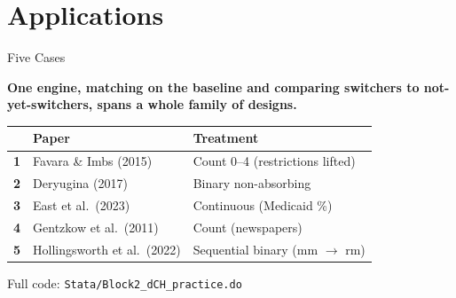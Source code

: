 \documentclass[main.tex]{subfiles}
\begin{document}
\section{Applications}


\begin{frame}{Five Cases}

  \textbf{One engine, matching on the baseline and comparing switchers to
  not-yet-switchers, spans a whole family of designs.}

  \medskip
  \begin{tabular}{@{}cll@{}}
    \toprule
     & \textbf{Paper} & \textbf{Treatment} \\
    \midrule
    \textbf{1} & Favara \& Imbs (2015)        & Count 0--4 (restrictions lifted) \\[4pt]
    \textbf{2} & Deryugina (2017)             & Binary non-absorbing \\[4pt]
    \textbf{3} & East et al.\ (2023)          & Continuous (Medicaid \%) \\[4pt]
    \textbf{4} & Gentzkow et al.\ (2011)      & Count (newspapers) \\[4pt]
    \textbf{5} & Hollingsworth et al.\ (2022) & Sequential binary (mm $\to$ rm) \\
    \bottomrule
  \end{tabular}

  \bigskip
  Full code: \texttt{Stata/Block2\_dCH\_practice.do}

\end{frame}

\end{document}
